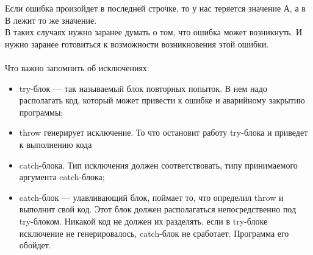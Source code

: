 \documentclass[a4paper,10pt]{article}
\begin{document}
Если ошибка произойдет в последней строчке, то у нас теряется значение А, а в В лежит то же значение.
\\В таких случаях нужно заранее думать о том, что ошибка может возникнуть. И нужно заранее готовиться к возможности возникновения этой ошибки.
\\
\\Что важно запомнить об исключениях:
\begin{itemize}
\item try-блок — так называемый блок повторных попыток. В нем надо располагать код, который может привести к ошибке и аварийному закрытию программы;
\item throw генерирует исключение. То что остановит работу try-блока и приведет к выполнению кода \item catch-блока. Тип исключения должен соответствовать, типу принимаемого аргумента catch-блока;
\item catch-блок — улавливающий блок, поймает то, что определил  throw и выполнит свой код. Этот блок должен располагаться непосредственно под try-блоком. Никакой код не должен их разделять.
если в try-блоке исключение не генерировалось, catch-блок не сработает. Программа его обойдет.
\end{itemize}
\end{document}
